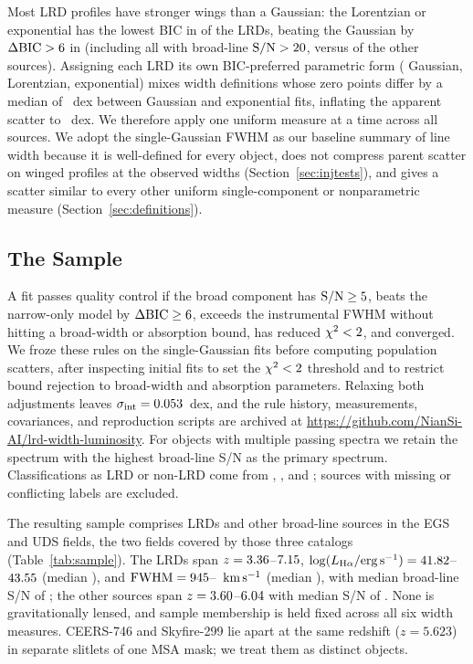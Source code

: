 \documentclass[twocolumn,linenumbers]{aastex701}
\newcommand{\kms}{\ensuremath{{\rm km\,s^{-1}}}}
\newcommand{\ergs}{\ensuremath{{\rm erg\,s^{-1}}}}
\newcommand{\sigint}{\sigma_{\rm int}}
\newcommand{\LHa}{L_{\rm H\alpha}}
\begin{document}
Most LRD profiles have stronger wings than a Gaussian: the Lorentzian or exponential has the lowest BIC in \NBICwing{} of the \NLRD{} LRDs, beating the Gaussian by $\Delta{\rm BIC}>6{}$ in \NBICsix{} (including all \NBIChiSN{} with broad-line ${\rm S/N}>20$, versus \NBICsixOth{} of the \NOther{} other sources).
Assigning each LRD its own BIC-preferred parametric form (\NBICgauss{} Gaussian, \NBIClor{} Lorentzian, \NBICexp{} exponential) mixes width definitions whose zero points differ by a median of \dWge{}~dex between Gaussian and exponential fits, inflating the apparent scatter to \DsigBic{}~dex.
We therefore apply one uniform measure at a time across all sources.
We adopt the single-Gaussian FWHM as our baseline summary of line width because it is well-defined for every object, does not compress parent scatter on winged profiles at the observed widths (Section~\ref{sec:injtests}), and gives a scatter similar to every other uniform single-component or nonparametric measure (Section~\ref{sec:definitions}).

\subsection{The Sample} \label{sec:sample}

A fit passes quality control if the broad component has ${\rm S/N}\geq5{}$, beats the narrow-only model by $\Delta{\rm BIC}\geq6{}$, exceeds the instrumental FWHM without hitting a broad-width or absorption bound, has reduced $\chi^2<2{}$, and converged.
We froze these rules on the single-Gaussian fits before computing population scatters, after inspecting initial fits to set the $\chi^2<2{}$ threshold and to restrict bound rejection to broad-width and absorption parameters.
Relaxing both adjustments leaves $\sigint=\sigIncA{}$~dex, and the rule history, measurements, covariances, and reproduction scripts are archived at \url{https://github.com/NianSi-AI/lrd-width-luminosity}.
For objects with multiple passing spectra we retain the spectrum with the highest broad-line S/N as the primary spectrum.
Classifications as LRD or non-LRD come from \citet{Taylor2025}, \citet{Kocevski2026}, and \citet{Hviding2025}; sources with missing or conflicting labels are excluded.

The resulting sample comprises \NLRD{} LRDs and \NOther{} other broad-line sources in the EGS and UDS fields, the two fields covered by those three catalogs (Table~\ref{tab:sample}).
The LRDs span $z=3.36{}$--$7.15{}$, $\log(\LHa/\ergs)=\LLRDmin{}$--$43.55{}$ (median \LLRDmed{}), and ${\rm FWHM}=945{}$--\WLRDmax{}~\kms{} (median \WLRDmed{}), with median broad-line S/N of \SNLRDmed{}; the \NOther{} other sources span $z=3.60{}$--$6.04{}$ with median S/N of \SNOthmed{}.
None is gravitationally lensed, and sample membership is held fixed across all six width measures.
CEERS-746 and Skyfire-299 lie \sepPair{}\arcsec{} apart at the same redshift ($z=5.623$) in separate slitlets of one MSA mask; we treat them as distinct objects.
\end{document}

